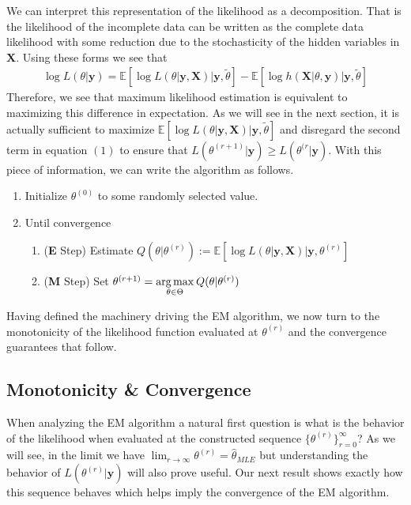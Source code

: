 \documentclass{article}
\newcommand{\E}{{\mathbb{E}}}
\begin{document}
We can interpret this representation of the likelihood as a decomposition. That is the likelihood of the incomplete data can be written as the complete data likelihood with some reduction due to the stochasticity of the hidden variables in $\mathbf{X}$. Using these forms we see that 
\begin{align}
\log L(\theta|\mathbf{y}) = \E\left[\log L(\theta|\mathbf{y},\mathbf{X})\big|\mathbf{y},\tilde{\theta}\right] - \E\left[\log h(\mathbf{X}|\theta,\mathbf{y})\big| \mathbf{y},\tilde{\theta}\right]
\end{align}
Therefore, we see that maximum likelihood estimation is equivalent to maximizing this difference in expectation. As we will see in the next section, it is actually sufficient to maximize $\E\left[\log L(\theta|\mathbf{y},\mathbf{X})\big|\mathbf{y},\tilde{\theta}\right]$ and disregard the second term in equation $(1)$ to ensure that $L(\theta^{(r+1)}|\mathbf{y})\geq L(\theta^{(r}|\mathbf{y})$. With this piece of information, we can write the algorithm as follows.
\begin{enumerate}
\item Initialize $\theta^{(0)}$ to some randomly selected value. 
\item Until convergence
	\begin{enumerate}
	\item (\textbf{E} Step) Estimate $Q(\theta|\theta^{(r)}):= \E\left[\log L(\theta|\mathbf{y},\mathbf{X})\big|\mathbf{y},\theta^{(r)}\right]$
	\item (\textbf{M} Step) Set $\theta^{(r+1)} = \underset{\theta\in\Theta}{\arg\max} \hspace{.2em}Q(\theta|\theta^{(r)})$
	\end{enumerate}
\end{enumerate}
Having defined the machinery driving the EM algorithm, we now turn to the monotonicity of the likelihood function evaluated at $\theta^{(r)}$ and the convergence guarantees that follow. 

\subsection{Monotonicity \& Convergence}

When analyzing the EM algorithm a natural first question is what is the behavior of the likelihood when evaluated at the constructed sequence $\{\theta^{(r)}\}_{r=0}^{\infty}$? As we will see, in the limit we have $\lim_{r\to\infty}\theta^{(r)} = \hat{\theta}_{MLE}$ but understanding the behavior of $L(\theta^{(r)}|\mathbf{y})$ will also prove useful. Our next result shows exactly how this sequence behaves which helps imply the convergence of the EM algorithm.
\end{document}
